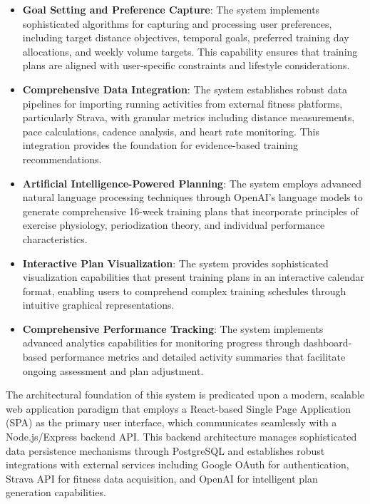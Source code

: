 \begin{itemize}
    \item \textbf{Goal Setting and Preference Capture}: The system implements sophisticated algorithms for capturing and processing user preferences, including target distance objectives, temporal goals, preferred training day allocations, and weekly volume targets. This capability ensures that training plans are aligned with user-specific constraints and lifestyle considerations.
    
    \item \textbf{Comprehensive Data Integration}: The system establishes robust data pipelines for importing running activities from external fitness platforms, particularly Strava, with granular metrics including distance measurements, pace calculations, cadence analysis, and heart rate monitoring. This integration provides the foundation for evidence-based training recommendations.
    
    \item \textbf{Artificial Intelligence-Powered Planning}: The system employs advanced natural language processing techniques through OpenAI's language models to generate comprehensive 16-week training plans that incorporate principles of exercise physiology, periodization theory, and individual performance characteristics.
    
    \item \textbf{Interactive Plan Visualization}: The system provides sophisticated visualization capabilities that present training plans in an interactive calendar format, enabling users to comprehend complex training schedules through intuitive graphical representations.
    
    \item \textbf{Comprehensive Performance Tracking}: The system implements advanced analytics capabilities for monitoring progress through dashboard-based performance metrics and detailed activity summaries that facilitate ongoing assessment and plan adjustment.
\end{itemize}

The architectural foundation of this system is predicated upon a modern, scalable web application paradigm that employs a React-based Single Page Application (SPA) as the primary user interface, which communicates seamlessly with a Node.js/Express backend API. This backend architecture manages sophisticated data persistence mechanisms through PostgreSQL and establishes robust integrations with external services including Google OAuth for authentication, Strava API for fitness data acquisition, and OpenAI for intelligent plan generation capabilities.

